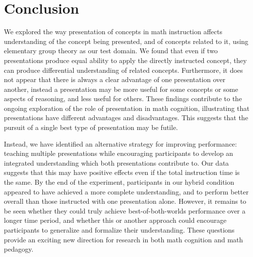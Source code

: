 \documentclass[man,mask,10pt]{apa6}
\begin{document}
\section{Conclusion}
We explored the way presentation of concepts in math instruction affects understanding of the concept being presented, and of concepts related to it, using elementary group theory as our test domain. We found that even if two presentations produce equal ability to apply the directly instructed concept, they can produce differential understanding of related concepts. Furthermore, it does not appear that there is always a clear advantage of one presentation over another, instead a presentation may be more useful for some concepts or some aspects of reasoning, and less useful for others. These findings contribute to the ongoing exploration of the role of presentation in math cognition, illustrating that presentations have different advantages and disadvantages. This suggests that the pursuit of a single best type of presentation may be futile. \par
Instead, we have identified an alternative strategy for improving performance: teaching multiple presentations while encouraging participants to develop an integrated understanding which both presentations contribute to. Our data suggests that this may have positive effects even if the total instruction time is the same. By the end of the experiment, participants in our hybrid condition appeared to have achieved a more complete understanding, and to perform better overall than those instructed with one presentation alone. However, it remains to be seen whether they could truly achieve best-of-both-worlds performance over a longer time period, and whether this or another approach could encourage participants to generalize and formalize their understanding. These questions provide an exciting new direction for research in both math cognition and math pedagogy.  
 





\setcounter{secnumdepth}{-1}
\clearpage
\end{document}
